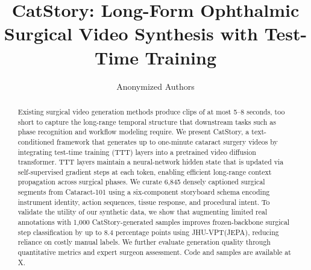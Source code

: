 \documentclass[runningheads]{llncs}
\begin{document}
%
\title{CatStory: Long-Form Ophthalmic Surgical Video Synthesis with Test-Time Training}
%

\author{Anonymized Authors}  %
  
\maketitle              %
%
\begin{abstract}
Existing surgical video generation methods produce clips of at most 5--8 seconds, too short to capture the long-range temporal structure that downstream tasks such as phase recognition and workflow modeling require. We present CatStory, a text-conditioned framework that generates up to one-minute cataract surgery videos by integrating test-time training (TTT) layers into a pretrained video diffusion transformer. TTT layers maintain a neural-network hidden state that is updated via self-supervised gradient steps at each token, enabling efficient long-range context propagation across surgical phases. We curate 6,845 densely captioned surgical segments from Cataract-101 using a six-component storyboard schema encoding instrument identity, action sequences, tissue response, and procedural intent. To validate the utility of our synthetic data, we show that augmenting limited real annotations with 1,000 CatStory-generated samples improves frozen-backbone surgical step classification by up to 8.4 percentage points using JHU-VPT(JEPA), reducing reliance on costly manual labels. We further evaluate generation quality through quantitative metrics and expert surgeon assessment. Code and samples are available at X.


\end{abstract}
%
%
%
\end{document}
